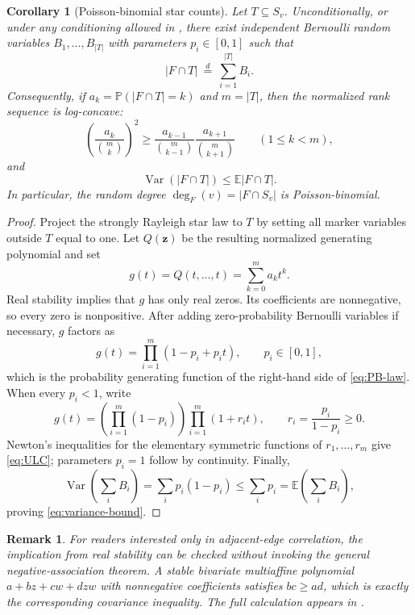 \documentclass[11pt]{article}
\numberwithin{equation}{section}
\newtheorem{corollary}[theorem]{Corollary}
\newtheorem{remark}[theorem]{Remark}
\newcommand{\bbP}{\mathbb P}
\newcommand{\bbE}{\mathbb E}
\newcommand{\zz}{\bm z}
\newcommand{\Var}{\operatorname{Var}}
\begin{document}
\begin{corollary}[Poisson-binomial star counts]\label{cor:poisson-binomial}
Let $T\subseteq S_v$.  Unconditionally, or under any conditioning allowed in , there exist independent Bernoulli random variables $B_1,\dots,B_{|T|}$ with parameters $p_i\in[0,1]$ such that
\begin{equation}\label{eq:PB-law}
 |F\cap T|\ \stackrel{d}{=}\ \sum_{i=1}^{|T|}B_i.
\end{equation}
Consequently, if $a_k=\bbP(|F\cap T|=k)$ and $m=|T|$, then the normalized rank sequence is log-concave:
\begin{equation}\label{eq:ULC}
 \left(\frac{a_k}{\binom{m}{k}}\right)^2
 \geq
 \frac{a_{k-1}}{\binom{m}{k-1}}
 \frac{a_{k+1}}{\binom{m}{k+1}}
 \qquad(1\leq k<m),
\end{equation}
and
\begin{equation}\label{eq:variance-bound}
 \Var(|F\cap T|)\leq \bbE|F\cap T|.
\end{equation}
In particular, the random degree $\deg_F(v)=|F\cap S_v|$ is Poisson-binomial.
\end{corollary}

\begin{proof}
Project the strongly Rayleigh star law to $T$ by setting all marker variables outside $T$ equal to one.  Let $Q(\zz)$ be the resulting normalized generating polynomial and set
\[
 g(t)=Q(t,\dots,t)=\sum_{k=0}^m a_kt^k.
\]
Real stability implies that $g$ has only real zeros.  Its coefficients are nonnegative, so every zero is nonpositive.  After adding zero-probability Bernoulli variables if necessary, $g$ factors as
\begin{equation}\label{eq:PB-factorization}
 g(t)=\prod_{i=1}^m(1-p_i+p_it),
 \qquad p_i\in[0,1],
\end{equation}
which is the probability generating function of the right-hand side of \eqref{eq:PB-law}.  When every $p_i<1$, write
\[
 g(t)=\left(\prod_{i=1}^m(1-p_i)\right)
       \prod_{i=1}^m(1+r_it),
 \qquad r_i=\frac{p_i}{1-p_i}\geq0.
\]
Newton's inequalities for the elementary symmetric functions of $r_1,\dots,r_m$ give \eqref{eq:ULC}; parameters $p_i=1$ follow by continuity.  Finally,
\[
 \Var\!\left(\sum_iB_i\right)
 =\sum_i p_i(1-p_i)
 \leq\sum_i p_i
 =\bbE\!\left(\sum_iB_i\right),
\]
proving \eqref{eq:variance-bound}.
\end{proof}

\begin{remark}\label{rem:direct-bivariate}
For readers interested only in adjacent-edge correlation, the implication from real stability can be checked without invoking the general negative-association theorem.  A stable bivariate multiaffine polynomial $a+bz+cw+dzw$ with nonnegative coefficients satisfies $bc\geq ad$, which is exactly the corresponding covariance inequality.  The full calculation appears in .
\end{remark}
\end{document}
